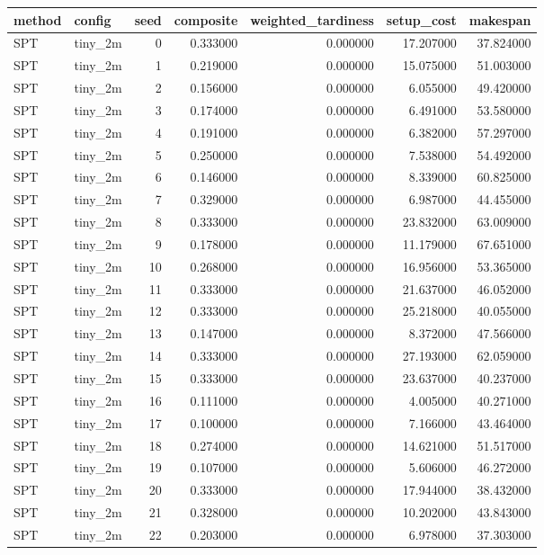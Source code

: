 \begin{tabular}{llrrrrr}
\toprule
method & config & seed & composite & weighted_tardiness & setup_cost & makespan \\
\midrule
SPT & tiny_2m & 0 & 0.333000 & 0.000000 & 17.207000 & 37.824000 \\
SPT & tiny_2m & 1 & 0.219000 & 0.000000 & 15.075000 & 51.003000 \\
SPT & tiny_2m & 2 & 0.156000 & 0.000000 & 6.055000 & 49.420000 \\
SPT & tiny_2m & 3 & 0.174000 & 0.000000 & 6.491000 & 53.580000 \\
SPT & tiny_2m & 4 & 0.191000 & 0.000000 & 6.382000 & 57.297000 \\
SPT & tiny_2m & 5 & 0.250000 & 0.000000 & 7.538000 & 54.492000 \\
SPT & tiny_2m & 6 & 0.146000 & 0.000000 & 8.339000 & 60.825000 \\
SPT & tiny_2m & 7 & 0.329000 & 0.000000 & 6.987000 & 44.455000 \\
SPT & tiny_2m & 8 & 0.333000 & 0.000000 & 23.832000 & 63.009000 \\
SPT & tiny_2m & 9 & 0.178000 & 0.000000 & 11.179000 & 67.651000 \\
SPT & tiny_2m & 10 & 0.268000 & 0.000000 & 16.956000 & 53.365000 \\
SPT & tiny_2m & 11 & 0.333000 & 0.000000 & 21.637000 & 46.052000 \\
SPT & tiny_2m & 12 & 0.333000 & 0.000000 & 25.218000 & 40.055000 \\
SPT & tiny_2m & 13 & 0.147000 & 0.000000 & 8.372000 & 47.566000 \\
SPT & tiny_2m & 14 & 0.333000 & 0.000000 & 27.193000 & 62.059000 \\
SPT & tiny_2m & 15 & 0.333000 & 0.000000 & 23.637000 & 40.237000 \\
SPT & tiny_2m & 16 & 0.111000 & 0.000000 & 4.005000 & 40.271000 \\
SPT & tiny_2m & 17 & 0.100000 & 0.000000 & 7.166000 & 43.464000 \\
SPT & tiny_2m & 18 & 0.274000 & 0.000000 & 14.621000 & 51.517000 \\
SPT & tiny_2m & 19 & 0.107000 & 0.000000 & 5.606000 & 46.272000 \\
SPT & tiny_2m & 20 & 0.333000 & 0.000000 & 17.944000 & 38.432000 \\
SPT & tiny_2m & 21 & 0.328000 & 0.000000 & 10.202000 & 43.843000 \\
SPT & tiny_2m & 22 & 0.203000 & 0.000000 & 6.978000 & 37.303000 \\

\end{tabular}

